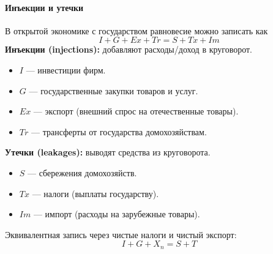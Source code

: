 \paragraph{Инъекции и утечки}
В открытой экономике с государством равновесие можно записать как
\[
  I + G + Ex + Tr = S + Tx + Im
\]
\textbf{Инъекции (injections):} добавляют расходы/доход в круговорот.
\begin{itemize}
  \item $I$ --- инвестиции фирм.
  \item $G$ --- государственные закупки товаров и услуг.
  \item $Ex$ --- экспорт (внешний спрос на отечественные товары).
  \item $Tr$ --- трансферты от государства домохозяйствам.
\end{itemize}
\textbf{Утечки (leakages):} выводят средства из круговорота.
\begin{itemize}
  \item $S$ --- сбережения домохозяйств.
  \item $Tx$ --- налоги (выплаты государству).
  \item $Im$ --- импорт (расходы на зарубежные товары).
\end{itemize}
Эквивалентная запись через чистые налоги и чистый экспорт:
\[
  I + G + X_n = S + T
\]
